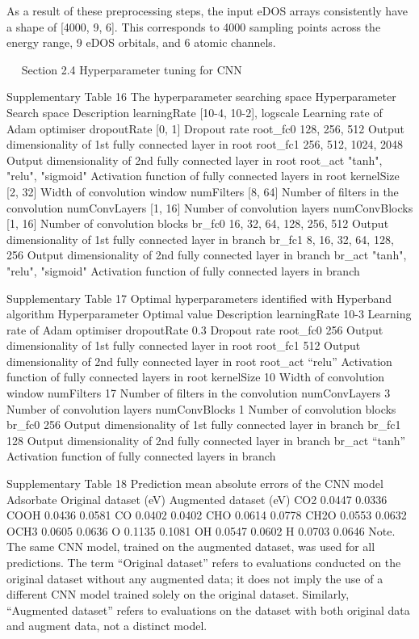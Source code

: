 As a result of these preprocessing steps, the input eDOS arrays consistently have a shape of [4000, 9, 6]. This corresponds to 4000 sampling points across the energy range, 9 eDOS orbitals, and 6 atomic channels.


 
Section 2.4 Hyperparameter tuning for CNN

Supplementary Table 16
The hyperparameter searching space
Hyperparameter	Search space	Description
learningRate	[10-4, 10-2], logscale	Learning rate of Adam optimiser
dropoutRate	[0, 1]	Dropout rate
root_fc0	128, 256, 512	Output dimensionality of 1st fully connected layer in root
root_fc1	256, 512, 1024, 2048	Output dimensionality of 2nd fully connected layer in root
root_act	"tanh", "relu", "sigmoid"	Activation function of fully connected layers in root
kernelSize	[2, 32]	Width of convolution window
numFilters	[8, 64]	Number of filters in the convolution
numConvLayers	[1, 16]	Number of convolution layers
numConvBlocks	[1, 16]	Number of convolution blocks
br_fc0	16, 32, 64, 128, 256, 512	Output dimensionality of 1st fully connected layer in branch
br_fc1	8, 16, 32, 64, 128, 256	Output dimensionality of 2nd fully connected layer in branch
br_act	"tanh", "relu", "sigmoid"	Activation function of fully connected layers in branch


Supplementary Table 17
Optimal hyperparameters identified with Hyperband algorithm
Hyperparameter	Optimal value	Description
learningRate	10-3	Learning rate of Adam optimiser
dropoutRate	0.3	Dropout rate
root_fc0	256	Output dimensionality of 1st fully connected layer in root
root_fc1	512	Output dimensionality of 2nd fully connected layer in root
root_act	“relu”	Activation function of fully connected layers in root
kernelSize	10	Width of convolution window
numFilters	17	Number of filters in the convolution
numConvLayers	3	Number of convolution layers
numConvBlocks	1	Number of convolution blocks
br_fc0	256	Output dimensionality of 1st fully connected layer in branch
br_fc1	128	Output dimensionality of 2nd fully connected layer in branch
br_act	“tanh”	Activation function of fully connected layers in branch


Supplementary Table 18
Prediction mean absolute errors of the CNN model
Adsorbate	Original dataset (eV)	Augmented dataset (eV)
CO2	0.0447	0.0336
COOH	0.0436	0.0581
CO	0.0402	0.0402
CHO	0.0614	0.0778
CH2O	0.0553	0.0632
OCH3	0.0605	0.0636
O	0.1135	0.1081
OH	0.0547	0.0602
H	0.0703	0.0646
Note. The same CNN model, trained on the augmented dataset, was used for all predictions. The term “Original dataset” refers to evaluations conducted on the original dataset without any augmented data; it does not imply the use of a different CNN model trained solely on the original dataset. Similarly, “Augmented dataset” refers to evaluations on the dataset with both original data and augment data, not a distinct model.


